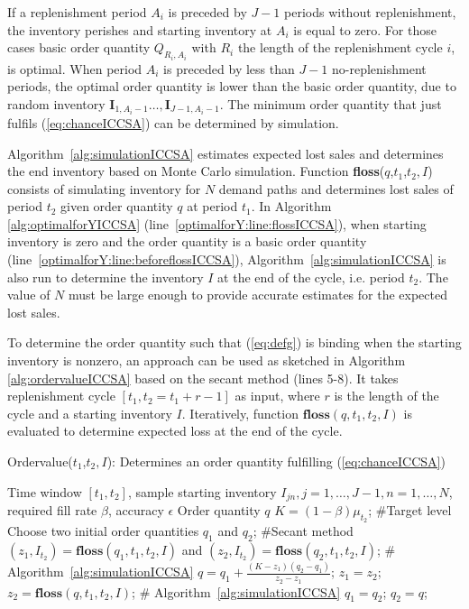 \noindent If a replenishment period $A_i$ is preceded by $J-1$ periods without replenishment, the inventory perishes and starting inventory at $A_i$ is equal to zero. For those cases basic order quantity $Q_{R_i,A_i}$ with $R_i$ the length of the replenishment cycle $i$, is optimal. When period $A_i$ is preceded by less than $J-1$ no-replenishment periods, the optimal order quantity is lower than the basic order quantity, due to random inventory $\boldsymbol{I}_{1,A_{i}-1}\ldots,\boldsymbol{I}_{J-1,A_{i}-1}$. The minimum order quantity that just fulfils (\ref{eq:chanceICCSA}) can be determined by simulation.


Algorithm~\ref{alg:simulationICCSA} estimates expected lost sales and determines the end inventory based on Monte Carlo simulation. Function \textbf{floss}($q$,$t_1$,$t_2,I$)  consists of simulating inventory for $N$ demand paths and determines lost sales of period  $t_2$ given order quantity $q$ at period $t_1$. In Algorithm \ref{alg:optimalforYICCSA} (line~\ref{optimalforY:line:flossICCSA}), when starting inventory is zero and the order quantity is a basic order quantity (line~\ref{optimalforY:line:beforeflossICCSA}), Algorithm~\ref{alg:simulationICCSA} is also run to determine the inventory $I$ at the end of the cycle, i.e. period $t_2$. The value of $N$ must be large enough to provide accurate estimates for the expected lost sales.


To determine the order quantity such that (\ref{eq:defg}) is binding when the starting inventory is nonzero, an approach can be used as sketched in Algorithm \ref{alg:ordervalueICCSA} based on the secant method (lines 5-8). It takes replenishment cycle $[t_1,t_2=t_1+r-1]$ as input, where $r$ is the length of the cycle and a starting inventory $I$.
Iteratively, function $\textbf{floss}(q,t_1,t_2,I)$ is evaluated to determine expected loss at the end of the cycle. %


 \begin{algorithm}[h]
 \caption{Ordervalue($t_1$,$t_2,I$): Determines an order quantity fulfilling (\ref{eq:chanceICCSA})}
 \label{alg:ordervalueICCSA}
 \begin{algorithmic}[1]
 \REQUIRE Time window $[t_1,t_2]$, sample starting inventory $I_{jn}, j=1,\ldots,J-1, n=1,\ldots,N$, required fill rate $\beta$, accuracy $\epsilon$
 \ENSURE Order quantity $q$
 \medskip
 \STATE $K=(1-\beta) \mu_{t_2}$; \hfill \#Target level
 \STATE Choose two initial order quantities $q_1$ and $q_2$; \hfill \#Secant method
 \STATE $(z_1,I_{t_2}) = \textbf{floss}(q_1,t_1,t_2,I)$ and  $(z_2,I_{t_2}) = \textbf{floss}(q_2,t_1,t_2,I)$; \hfill \# Algorithm~\ref{alg:simulationICCSA}
 \STATE $q = q_1 + \frac{(K-z_1)(q_2-q_1)}{z_2-z_1}$;
 \STATE $z_1 = z_2$;
 \STATE $z_2 = \textbf{floss}(q,t_1,t_2,I)$; \hfill  \# Algorithm~\ref{alg:simulationICCSA}
 \STATE $q_1 = q_2$; $q_2 = q$;
 \ENDWHILE
 \vskip 5pt
 \end{algorithmic}
 \end{algorithm}


